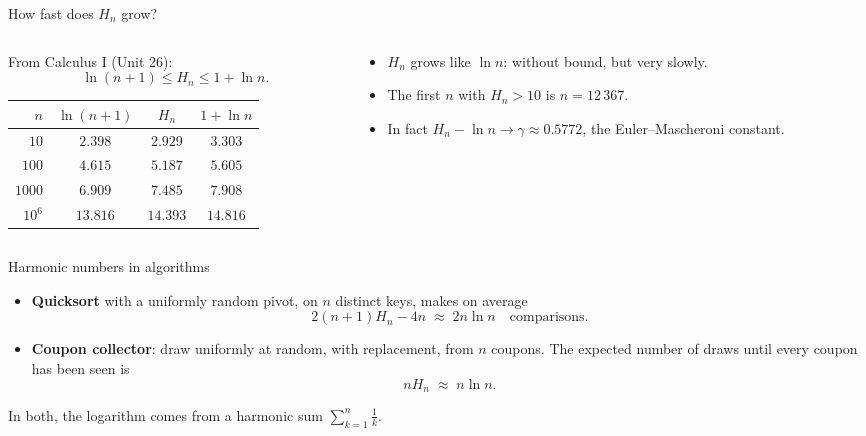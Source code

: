 \documentclass[10pt]{wosm-slides}
\begin{document}
\begin{frame}{How fast does $H_n$ grow?}
  \begin{columns}[T]
    \begin{column}{0.5\textwidth}
      From Calculus I (Unit 26):
      \[ \ln(n+1) \le H_n \le 1 + \ln n . \]
      \begin{center}
      \small
      \begin{tabular}{rccc}
        \toprule
        $n$ & $\ln(n+1)$ & $H_n$ & $1 + \ln n$ \\
        \midrule
        $10$     & $2.398$  & $2.929$  & $3.303$ \\
        $100$    & $4.615$  & $5.187$  & $5.605$ \\
        $1000$   & $6.909$  & $7.485$  & $7.908$ \\
        $10^6$   & $13.816$ & $14.393$ & $14.816$ \\
        \bottomrule
      \end{tabular}
      \end{center}
    \end{column}
    \begin{column}{0.46\textwidth}
      \begin{itemize}
        \item $H_n$ grows like $\ln n$: without bound, but very slowly.
        \item The first $n$ with $H_n > 10$ is $n = 12\,367$.
        \item In fact $H_n - \ln n \to \gamma \approx 0.5772$,
          the Euler--Mascheroni constant.
      \end{itemize}
    \end{column}
  \end{columns}
\end{frame}

\begin{frame}{Harmonic numbers in algorithms}
  \begin{itemize}
    \item \textbf{Quicksort} with a uniformly random pivot, on $n$ distinct keys, makes
      on average
      \[ 2(n+1) H_n - 4n \;\approx\; 2 n \ln n \quad\text{comparisons.} \]
    \item \textbf{Coupon collector}: draw uniformly at random, with replacement,
      from $n$ coupons. The expected number of draws until every coupon has been seen is
      \[ n H_n \;\approx\; n \ln n . \]
  \end{itemize}
  In both, the logarithm comes from a harmonic sum $\sum_{k=1}^{n} \frac1k$.
\end{frame}
\end{document}
